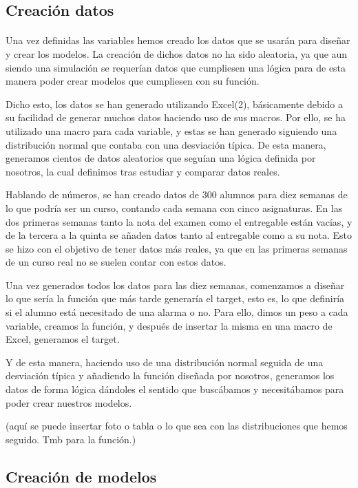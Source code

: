 \subsection{Creación datos}
\paragraph{}
Una vez definidas las variables hemos creado los datos que se usarán para diseñar y crear los modelos. La creación de dichos datos no ha sido aleatoria, ya que aun siendo una simulación se requerían datos que cumpliesen una lógica para de esta manera poder crear modelos que cumpliesen con su función.

Dicho esto, los datos se han generado utilizando Excel(2), básicamente debido a su facilidad de generar muchos datos haciendo uso de sus macros. Por ello, se ha utilizado una macro para cada variable, y estas se han generado siguiendo una distribución normal que contaba con una desviación típica. De esta manera, generamos cientos de datos aleatorios que seguían una lógica definida por nosotros, la cual definimos tras estudiar y comparar datos reales.

Hablando de números, se han creado datos de 300 alumnos para diez semanas de lo que podría ser un curso, contando cada semana con cinco asignaturas. En las dos primeras semanas tanto la nota del examen como el entregable están vacías, y de la tercera a la quinta se añaden datos tanto al entregable como a su nota. Esto se hizo con el objetivo de tener datos más reales, ya que en las primeras semanas de un curso real no se suelen contar con estos datos.

Una vez generados todos los datos para las diez semanas, comenzamos a diseñar lo que sería la función que más tarde generaría el target, esto es, lo que definiría si el alumno está necesitado de una alarma o no. Para ello, dimos un peso a cada variable, creamos la función, y después de insertar la misma en una macro de Excel, generamos el target.

Y de esta manera, haciendo uso de una distribución normal seguida de una desviación típica y añadiendo la función diseñada por nosotros, generamos los datos de forma lógica dándoles el sentido que buscábamos y necesitábamos para poder crear nuestros modelos.

(aquí se puede insertar foto o tabla o lo que sea con las distribuciones que hemos seguido. Tmb para la función.)


\subsection{Creación de modelos}
